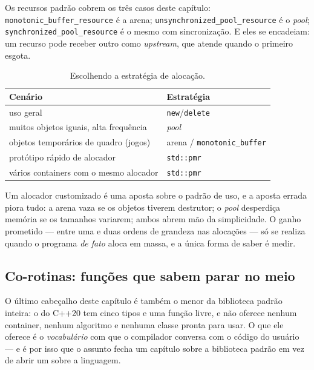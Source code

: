 Os recursos padrão cobrem os três casos deste capítulo:
\texttt{monotonic\_buffer\_resource} é a arena;
\texttt{unsynchronized\_pool\_resource} é o \emph{pool};
\texttt{synchronized\_pool\_resource} é o mesmo com sincronização. E eles se
encadeiam: um recurso pode receber outro como \emph{upstream}, que atende
quando o primeiro esgota.

\begin{table}[htbp]
\centering
\caption{Escolhendo a estratégia de alocação.}
\label{tab:escolha-alocador}
\footnotesize
\begin{tabular}{@{}ll@{}}
\toprule
\textbf{Cenário} & \textbf{Estratégia} \\
\midrule
uso geral                                   & \texttt{new}/\texttt{delete} \\
muitos objetos iguais, alta frequência      & \emph{pool} \\
objetos temporários de quadro (jogos)       & arena / \texttt{monotonic\_buffer} \\
protótipo rápido de alocador                & \texttt{std::pmr} \\
vários containers com o mesmo alocador      & \texttt{std::pmr} \\
\bottomrule
\end{tabular}
\end{table}

\begin{regra}
Um alocador customizado é uma aposta sobre o padrão de uso, e a aposta errada
piora tudo: a arena vaza se os objetos tiverem destrutor; o \emph{pool} desperdiça
memória se os tamanhos variarem; ambos abrem mão da simplicidade. O ganho
prometido --- entre uma e duas ordens de grandeza nas alocações --- só se
realiza quando o programa \emph{de fato} aloca em massa, e a única forma de
saber é medir.
\end{regra}


\subsection{Co-rotinas: funções que sabem parar no meio}
\label{sec:coroutines-lib}

O último cabeçalho deste capítulo é também o menor da biblioteca padrão inteira:
o  do C++20 tem cinco tipos e uma função livre, e não
oferece nenhum container, nenhum algoritmo e nenhuma classe pronta para usar. O
que ele oferece é o \emph{vocabulário} com que o compilador conversa com o
código do usuário --- e é por isso que o assunto fecha um capítulo sobre a
biblioteca padrão em vez de abrir um sobre a linguagem.

